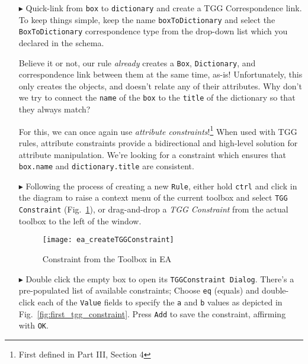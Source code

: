 \begin{enumerate}
\item[$\blacktriangleright$] Quick-link from \texttt{box} to \texttt{dictionary} and create a TGG Correspondence link. To keep things simple, keep the name 
\texttt{boxToDictionary} and select the \texttt{BoxToDictionary} correspondence type from the drop-down list which you declared in the schema.

\newpage

Believe it or not, our rule \emph{already} creates a \texttt{Box}, \texttt{Dictionary}, and correspondence link between them at the same time, as-is!
Unfortunately, this only creates the objects, and doesn't relate any of their attributes. Why don't we try to connect the \texttt{name} of the \texttt{box} to
the \texttt{title} of the dictionary so that they always match? 

For this, we can once again use \emph{attribute constraints}!\footnote{First defined in Part III, Section 4} When used with TGG rules, attribute constraints
provide a bidirectional and high-level solution for attribute manipulation. We're looking for a constraint which ensures that \texttt{box.name} and
\texttt{dictionary.title} are consistent.

\vspace{0.5cm}

\item[$\blacktriangleright$] Following the process of creating a new \texttt{Rule}, either hold \texttt{ctrl} and click in the diagram to raise a context menu
of the current toolbox and select \texttt{TGG Constraint} (Fig.~\ref{fig:common_toolbox}), or drag-and-drop a \emph{TGG Constraint} from the actual toolbox to
the left of the window.

\vspace{0.5cm}

\begin{figure}[htbp]
\begin{center}
  \texttt{[image: ea\_createTGGConstraint]}
  \caption{Constraint from the Toolbox in EA}
  \label{fig:common_toolbox}
\end{center}
\end{figure}

\item[$\blacktriangleright$] Double click the empty box to open its \texttt{TGGConstraint Dialog}. There's a pre-populated list of available constraints; Choose
\texttt{eq} (equals) and double-click each of the \texttt{Value} fields to specify the \texttt{a} and \texttt{b} values as depicted in
Fig.~\ref{fig:first_tgg_constraint}. Press \texttt{Add} to save the constraint, affirming with \texttt{OK}.


\end{enumerate}
